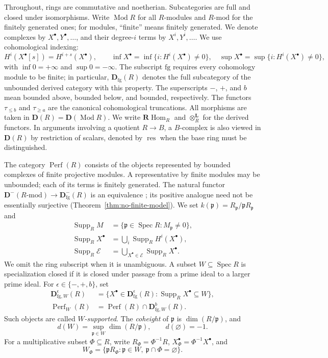 \documentclass[11pt]{amsart}
\numberwithin{equation}{section}
\theoremstyle{definition}
\theoremstyle{remark}
\DeclareMathOperator{\Supp}{Supp}
\DeclareMathOperator{\Spec}{Spec}
\DeclareMathOperator{\Perf}{Perf}
\DeclareMathOperator{\Hom}{Hom}
\DeclareMathOperator{\res}{res}
\newcommand{\RHom}{\mathbf R\!\Hom}
\newcommand{\D}{\mathbf D}
\newcommand{\fg}{\mathrm{fg}}
\newcommand{\Mod}{\operatorname{Mod}}
\newcommand{\p}{\mathfrak p}
\begin{document}
Throughout, rings are commutative and noetherian. Subcategories are full
and closed under isomorphisms. Write $\Mod R$ for all $R$-modules and
$R\text{-}\mathrm{mod}$ for the finitely generated ones; for modules,
``finite'' means finitely generated. We denote complexes by
$X^{\bullet},Y^{\bullet},\ldots$, and their degree-$i$ terms by
$X^i,Y^i,\ldots$. We use cohomological indexing:
\[
 H^i(X^{\bullet}[s])=H^{i+s}(X^{\bullet}),\qquad
 \inf X^{\bullet}=\inf\{i:H^i(X^{\bullet})\ne0\},\quad
 \sup X^{\bullet}=\sup\{i:H^i(X^{\bullet})\ne0\},
\]
with $\inf0=+\infty$ and $\sup0=-\infty$.
The subscript $\fg$ requires every cohomology module to be finite;
in particular, $\D_{\fg}(R)$ denotes the full subcategory of the
unbounded derived category with this property. The superscripts $-$, $+$, and $b$ mean bounded above, bounded below,
and bounded, respectively. The functors $\tau_{\leq b}$ and
$\tau_{\geq a}$ are the canonical cohomological truncations.
All morphisms are taken in $\D(R)=\D(\Mod R)$.
We write $\RHom_R$ and $\otimes_R^{\mathbf L}$ for the derived functors.
In arguments involving a quotient $R\to B$, a $B$-complex is also
viewed in $\D(R)$ by restriction of scalars, denoted by $\res$ when
the base ring must be distinguished.

The category $\Perf(R)$ consists of the objects represented by bounded
complexes of finite projective modules. A representative by finite modules may be unbounded; each of its terms is
finitely generated. The natural functor
$\D^-(R\text{-}\mathrm{mod})\to\D^-_{\fg}(R)$ is an equivalence
\cite[Proposition~2.1]{PS21}; its positive analogue need not be
essentially surjective (Theorem~\ref{thm:no-finite-model}).
We set $k(\p)=R_\p/\p R_\p$ and
\[
 \begin{aligned}
 \Supp_RM&=\{\p\in\Spec R:M_\p\ne0\},\\
 \Supp_R X^{\bullet}&=\bigcup_i\Supp_RH^i(X^{\bullet}),\\
 \Supp_R\mathcal E&=\bigcup_{X^{\bullet}\in\mathcal E}\Supp_R X^{\bullet}.
 \end{aligned}
\]
We omit the ring subscript when it is unambiguous. A subset
$W\subseteq\Spec R$ is specialization closed if it is closed under
passage from a prime ideal to a larger prime ideal. For
$\epsilon\in\{-,+,b\}$, set
\[
 \begin{aligned}
 \D^\epsilon_{\fg,W}(R)&=
 \{X^{\bullet}\in\D^\epsilon_{\fg}(R):\Supp_R X^{\bullet}\subseteq W\},\\
 \Perf_W(R)&=\Perf(R)\cap\D^b_{\fg,W}(R).
 \end{aligned}
\]
Such objects are called \emph{$W$-supported}.
The \emph{coheight} of $\p$ is $\dim(R/\p)$, and
\begin{equation}\label{eq:dimension}
 d(W)=\sup_{\p\in W}\dim(R/\p),\qquad d(\varnothing)=-1.
\end{equation}
For a multiplicative subset $\Phi\subseteq R$, write
$R_\Phi=\Phi^{-1}R$, $X^{\bullet}_\Phi=\Phi^{-1}X^{\bullet}$, and
\[
 W_\Phi=\{\p R_\Phi:\p\in W,\ \p\cap\Phi=\varnothing\}.
\]
\end{document}
